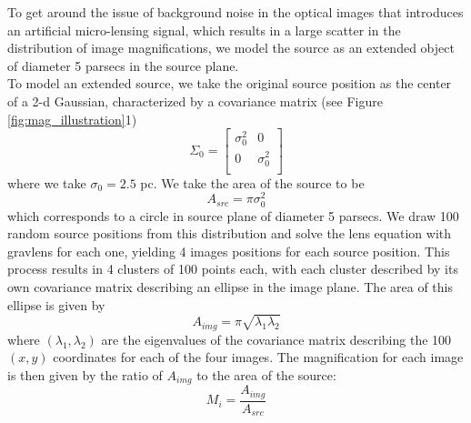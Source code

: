 \indent To get around the issue of background noise in the optical images that introduces an artificial micro-lensing signal, which results in a large scatter in the distribution of image magnifications, we model the source as an extended object of diameter 5 parsecs in the source plane.\\
\indent To model an extended source, we take the original source position as the center of a 2-d Gaussian, characterized by a covariance matrix (see Figure \ref{fig:mag_illustration}1)
\[
\Sigma_0 = \begin{bmatrix}
\sigma_0^2 & 0 \\ 
0 & \sigma_0^2 \\
\end{bmatrix}
\]
where we take $\sigma_0 = 2.5$ pc. We take the area of the source to be 
\begin{equation}
\nonumber A_{src} = \pi \sigma_0^2
\end{equation}
which corresponds to a circle in source plane of diameter 5 parsecs. We draw 100 random source positions from this distribution and solve the lens equation with gravlens for each one, yielding 4 images positions for each source position. This process results in 4 clusters of 100 points each, with each cluster described by its own covariance matrix describing an ellipse in the image plane. The area of this ellipse is given by
\begin{equation}
\nonumber A_{img} = \pi \sqrt{\lambda_1 \lambda_2}
\end{equation}
where $\left(\lambda_1,\lambda_2\right)$ are the eigenvalues of the covariance matrix describing the 100 $\left(x,y\right)$ coordinates for each of the four images. The magnification for each image is then given by the ratio of $A_{img}$ to the area of the source:
\begin{equation}
\nonumber M_{i} = \frac{A_{img}}{A_{src}}
\end{equation}

